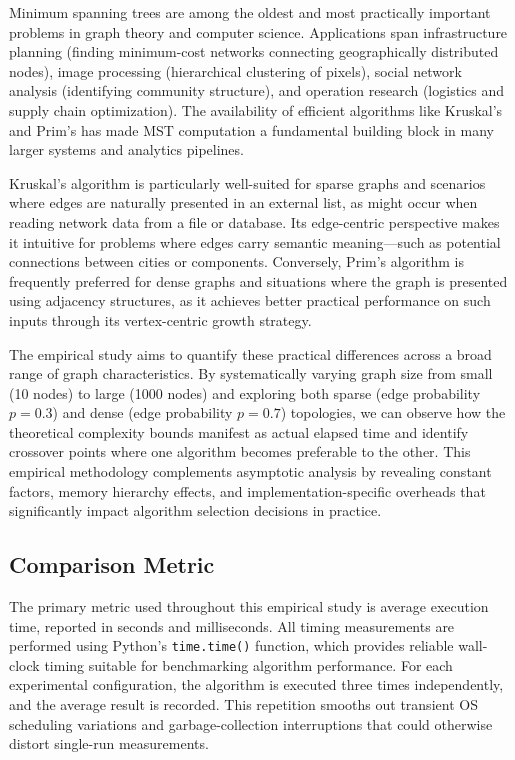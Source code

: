 ﻿\documentclass[12pt]{article}
\begin{document}
Minimum spanning trees are among the oldest and most practically important problems in graph theory and computer science. Applications span infrastructure planning (finding minimum-cost networks connecting geographically distributed nodes), image processing (hierarchical clustering of pixels), social network analysis (identifying community structure), and operation research (logistics and supply chain optimization). The availability of efficient algorithms like Kruskal's and Prim's has made MST computation a fundamental building block in many larger systems and analytics pipelines.

Kruskal's algorithm is particularly well-suited for sparse graphs and scenarios where edges are naturally presented in an external list, as might occur when reading network data from a file or database. Its edge-centric perspective makes it intuitive for problems where edges carry semantic meaning---such as potential connections between cities or components. Conversely, Prim's algorithm is frequently preferred for dense graphs and situations where the graph is presented using adjacency structures, as it achieves better practical performance on such inputs through its vertex-centric growth strategy.

The empirical study aims to quantify these practical differences across a broad range of graph characteristics. By systematically varying graph size from small (10 nodes) to large (1000 nodes) and exploring both sparse (edge probability $p=0.3$) and dense (edge probability $p=0.7$) topologies, we can observe how the theoretical complexity bounds manifest as actual elapsed time and identify crossover points where one algorithm becomes preferable to the other. This empirical methodology complements asymptotic analysis by revealing constant factors, memory hierarchy effects, and implementation-specific overheads that significantly impact algorithm selection decisions in practice.

\subsection{Comparison Metric}

The primary metric used throughout this empirical study is average execution time, reported in seconds and milliseconds. All timing measurements are performed using Python's \texttt{time.time()} function, which provides reliable wall-clock timing suitable for benchmarking algorithm performance. For each experimental configuration, the algorithm is executed three times independently, and the average result is recorded. This repetition smooths out transient OS scheduling variations and garbage-collection interruptions that could otherwise distort single-run measurements.
\end{document}
